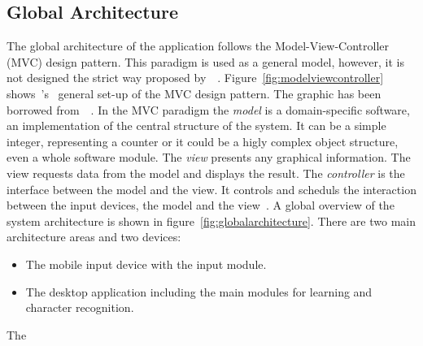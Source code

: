 \subsection{Global Architecture}
\label{sec:globalarchitecture}

The global architecture of the application follows the Model-View-Controller
(MVC) design pattern. This paradigm is used as a general model, however, 
it is not designed the strict way proposed 
by~~\citeyear{Krasner1988}.
Figure~\ref{fig:modelviewcontroller} 
shows~'s~\citeyear{Krasner1988} 
general set-up of the MVC design pattern. The graphic has been borrowed 
from~~\citeyear{Schatten2010}.
In the MVC paradigm the \emph{model} is a domain-specific software, 
an implementation of the central structure of the system. It can be a simple
integer, representing a counter or it could be a higly complex object structure, 
even a whole software module. The \emph{view} presents any graphical information.
The view requests data from the model and displays the result. 
The \emph{controller} is the interface between the model and the view. 
It controls and scheduls the interaction between the input devices, 
the model and the view~.
A global overview of the system architecture is shown in 
figure~\ref{fig:globalarchitecture}.
There are two main architecture areas and two devices:
\begin{itemize}
\item The mobile input device with the input module.
\item The desktop application including the main modules for learning
      and character recognition.
\end{itemize}
The

